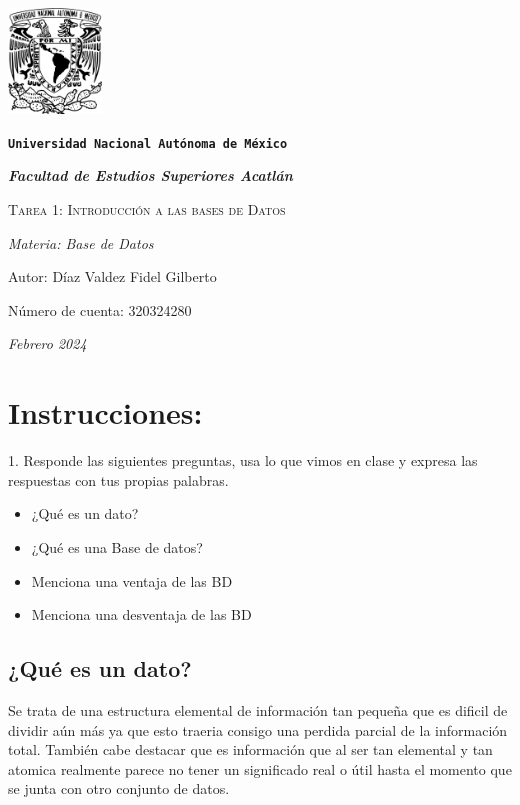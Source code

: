 \documentclass{article}
\begin{document}
\begin{titlepage}
    \centering
    {\includegraphics[width=2.5cm]{logo.png}\par}
    {\texttt{\bfseries \LARGE Universidad Nacional Autónoma de México} \par}
    \vspace{1cm}
    {\itshape \Large \bfseries Facultad de Estudios Superiores Acatlán \par}
    \vspace{3cm}
    {\scshape \Huge Tarea 1: Introducción a las bases de Datos \par}
    \vspace {3cm}
    {\slshape \Large Materia: Base de Datos \par}
    \vspace{2cm}
    {\Large Autor: Díaz Valdez Fidel Gilberto\par}
    {\Large Número de cuenta: 320324280\par}
    \vfill
    {\itshape Febrero 2024 \par}
\end{titlepage}

\section*{Instrucciones:}
1. Responde las siguientes preguntas, usa lo que vimos  en clase y expresa las respuestas con tus propias palabras.

\begin{itemize}
    \item ¿Qué es un dato?
    \item ¿Qué es una Base de datos?
    \item Menciona una ventaja de las BD
    \item Menciona  una desventaja de las BD
\end{itemize}

\subsection{¿Qué es un dato?}
Se trata de una estructura elemental de información tan pequeña que es dificil de dividir aún más ya que esto 
traeria consigo una perdida parcial de la información total. También cabe destacar que es información que al ser 
tan elemental y tan atomica realmente parece no tener un significado real o útil hasta el momento que se junta 
con otro conjunto de datos.
\end{document}
